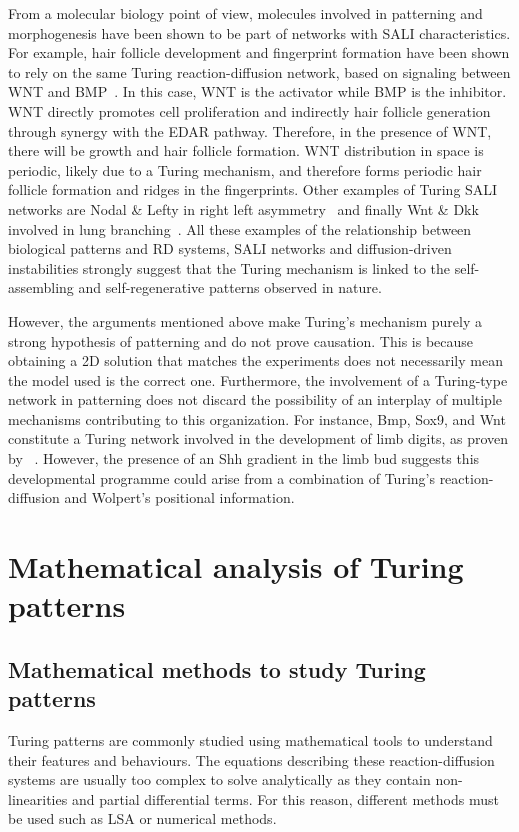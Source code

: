 From a molecular biology point of view, molecules involved in patterning and morphogenesis have been shown to be part of networks with SALI characteristics.
For example, hair follicle development and fingerprint formation have been shown to rely on the same Turing reaction-diffusion network, based on signaling between WNT and BMP~\parencite{Glover2023}.
In this case, WNT is the activator while BMP is the inhibitor.
WNT directly promotes cell proliferation and indirectly hair follicle generation through synergy with the EDAR pathway.
Therefore, in the presence of WNT, there will be growth and hair follicle formation.
WNT distribution in space is periodic, likely due to a Turing mechanism, and therefore forms periodic hair follicle formation and ridges in the fingerprints.
Other examples of Turing SALI networks are Nodal \& Lefty in right left asymmetry~\parencite{Nakamura2006} and finally Wnt \& Dkk involved in lung branching~\parencite{langhe2005_lung}.
All these examples of the relationship between biological patterns and RD systems, SALI networks and diffusion-driven instabilities strongly suggest that the Turing mechanism is linked to the self-assembling and self-regenerative patterns observed in nature.

However, the arguments mentioned above make Turing’s mechanism purely a strong hypothesis of patterning and do not prove causation.
This is because obtaining a 2D solution that matches the experiments does not necessarily mean the model used is the correct one.
Furthermore, the involvement of a Turing-type network in patterning does not discard the possibility of an interplay of multiple mechanisms contributing to this organization.
For instance, Bmp, Sox9, and Wnt constitute a Turing network involved in the development of limb digits, as proven by ~\cite{Raspopovic1}.
However, the presence of an Shh gradient in the limb bud suggests this developmental programme could arise from a combination of Turing's reaction-diffusion and Wolpert's positional information.


\section{Mathematical analysis of Turing patterns}

\subsection{Mathematical methods to study Turing patterns}
Turing patterns are commonly studied using mathematical tools to understand their features and behaviours.
The equations describing these reaction-diffusion systems are usually too complex to solve analytically as they contain non-linearities and partial differential terms.
For this reason, different methods must be used such as \acrfull{LSA} or numerical methods.

